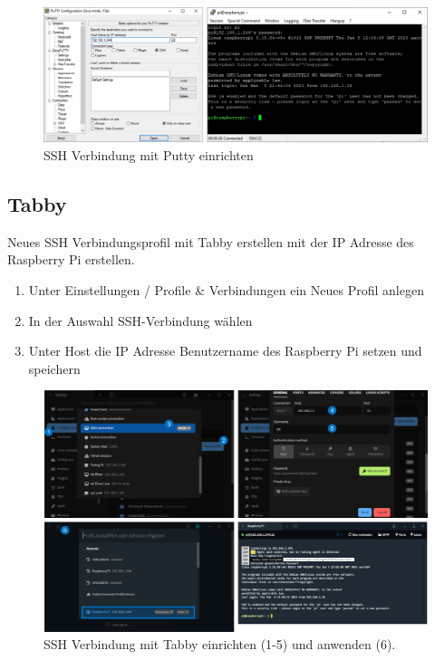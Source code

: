 \documentclass[
  11pt,
  a4paperpaper,
  oneside, openany  ,captions=tableheading
]{scrbook}
\providecommand{\tightlist}{%
  \setlength{\itemsep}{0pt}\setlength{\parskip}{0pt}}
\theoremstyle{definition}
\theoremstyle{remark}
\begin{document}
\begin{figure}[H]

{\centering \includegraphics{images/raspberry_pi_putty.png}

}

\caption{SSH Verbindung mit Putty einrichten}

\end{figure}%

\subsection{\texorpdfstring{Tabby}{Tabby}}\label{tabby}

Neues SSH Verbindungsprofil mit Tabby erstellen mit der IP Adresse des
Raspberry Pi erstellen.

\begin{enumerate}
\def\labelenumi{\arabic{enumi}.}
\tightlist
\item
  Unter Einstellungen / Profile \& Verbindungen ein Neues Profil anlegen
\item
  In der Auswahl SSH-Verbindung wählen
\item
  Unter Host die IP Adresse Benutzername des Raspberry Pi setzen und
  speichern
\end{enumerate}

\begin{figure}[H]

{\centering \includegraphics{images/raspberry_pi_tabby.png}

}

\caption{SSH Verbindung mit Tabby einrichten (1-5) und anwenden (6).}

\end{figure}%
\end{document}

